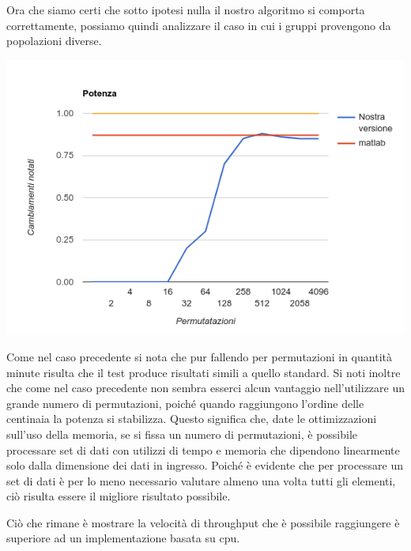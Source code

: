 Ora che siamo certi che sotto ipotesi nulla il nostro algoritmo si comporta correttamente, possiamo quindi analizzare il caso in cui i gruppi provengono da popolazioni diverse.
\begin{center}
\includegraphics[width=\linewidth]{potenza}
\end{center}

Come nel caso precedente si nota che pur fallendo per permutazioni in quantità minute risulta che il test produce risultati simili a quello standard. Si noti inoltre che come nel caso precedente non sembra esserci alcun vantaggio nell'utilizzare un grande numero di permutazioni, poiché quando raggiungono l'ordine delle centinaia la potenza si stabilizza. Questo significa che, date le ottimizzazioni sull'uso della memoria, se si fissa un numero di permutazioni, è possibile processare set di dati con utilizzi di tempo e memoria che dipendono linearmente solo dalla dimensione dei dati in ingresso. Poiché è evidente che per processare un set di dati è per lo meno necessario valutare almeno una volta tutti gli elementi, ciò risulta essere il migliore risultato possibile. 

Ciò che rimane è mostrare la velocità di throughput che è possibile raggiungere è superiore ad un implementazione basata su cpu.


